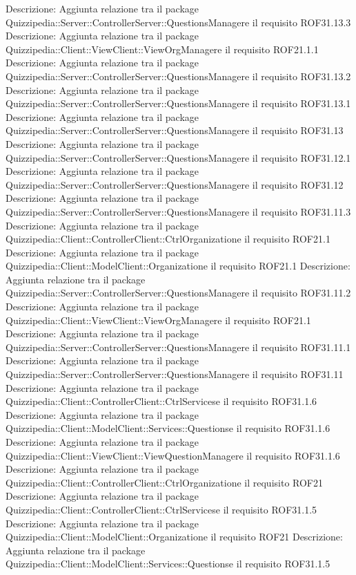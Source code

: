 Descrizione: Aggiunta relazione tra il package Quizzipedia::Server::ControllerServer::QuestionsManagere il requisito ROF31.13.3 
Descrizione: Aggiunta relazione tra il package Quizzipedia::Client::ViewClient::ViewOrgManagere il requisito ROF21.1.1 
Descrizione: Aggiunta relazione tra il package Quizzipedia::Server::ControllerServer::QuestionsManagere il requisito ROF31.13.2 
Descrizione: Aggiunta relazione tra il package Quizzipedia::Server::ControllerServer::QuestionsManagere il requisito ROF31.13.1 
Descrizione: Aggiunta relazione tra il package Quizzipedia::Server::ControllerServer::QuestionsManagere il requisito ROF31.13 
Descrizione: Aggiunta relazione tra il package Quizzipedia::Server::ControllerServer::QuestionsManagere il requisito ROF31.12.1 
Descrizione: Aggiunta relazione tra il package Quizzipedia::Server::ControllerServer::QuestionsManagere il requisito ROF31.12 
Descrizione: Aggiunta relazione tra il package Quizzipedia::Server::ControllerServer::QuestionsManagere il requisito ROF31.11.3 
Descrizione: Aggiunta relazione tra il package Quizzipedia::Client::ControllerClient::CtrlOrganizatione il requisito ROF21.1 
Descrizione: Aggiunta relazione tra il package Quizzipedia::Client::ModelClient::Organizatione il requisito ROF21.1 
Descrizione: Aggiunta relazione tra il package Quizzipedia::Server::ControllerServer::QuestionsManagere il requisito ROF31.11.2 
Descrizione: Aggiunta relazione tra il package Quizzipedia::Client::ViewClient::ViewOrgManagere il requisito ROF21.1 
Descrizione: Aggiunta relazione tra il package Quizzipedia::Server::ControllerServer::QuestionsManagere il requisito ROF31.11.1 
Descrizione: Aggiunta relazione tra il package Quizzipedia::Server::ControllerServer::QuestionsManagere il requisito ROF31.11 
Descrizione: Aggiunta relazione tra il package Quizzipedia::Client::ControllerClient::CtrlServicese il requisito ROF31.1.6 
Descrizione: Aggiunta relazione tra il package Quizzipedia::Client::ModelClient::Services::Questionse il requisito ROF31.1.6 
Descrizione: Aggiunta relazione tra il package Quizzipedia::Client::ViewClient::ViewQuestionManagere il requisito ROF31.1.6 
Descrizione: Aggiunta relazione tra il package Quizzipedia::Client::ControllerClient::CtrlOrganizatione il requisito ROF21 
Descrizione: Aggiunta relazione tra il package Quizzipedia::Client::ControllerClient::CtrlServicese il requisito ROF31.1.5 
Descrizione: Aggiunta relazione tra il package Quizzipedia::Client::ModelClient::Organizatione il requisito ROF21 
Descrizione: Aggiunta relazione tra il package Quizzipedia::Client::ModelClient::Services::Questionse il requisito ROF31.1.5 
